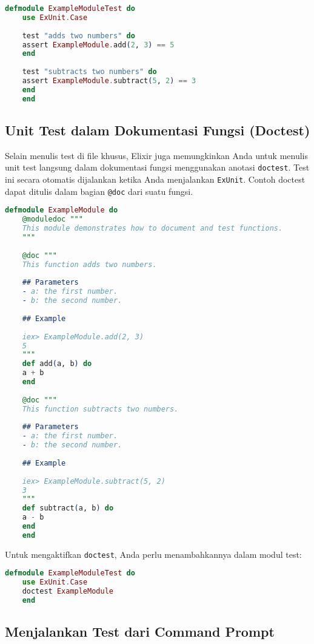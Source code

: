 \begin{lstlisting}[language=Elixir]
	defmodule ExampleModuleTest do
	use ExUnit.Case
	
	test "adds two numbers" do
	assert ExampleModule.add(2, 3) == 5
	end
	
	test "subtracts two numbers" do
	assert ExampleModule.subtract(5, 2) == 3
	end
	end
\end{lstlisting}

\subsection{Unit Test dalam Dokumentasi Fungsi (Doctest)}

Selain menulis test di file khusus, Elixir juga memungkinkan Anda untuk menulis unit test langsung dalam dokumentasi fungsi menggunakan anotasi \texttt{doctest}. Test ini secara otomatis dijalankan ketika Anda menjalankan \texttt{ExUnit}. Contoh doctest dapat ditulis dalam bagian \texttt{@doc} dari suatu fungsi.

\begin{lstlisting}[language=Elixir]
	defmodule ExampleModule do
	@moduledoc """
	This module demonstrates how to document and test functions.
	"""
	
	@doc """
	This function adds two numbers.
	
	## Parameters
	- a: the first number.
	- b: the second number.
	
	## Example
	
	iex> ExampleModule.add(2, 3)
	5
	"""
	def add(a, b) do
	a + b
	end
	
	@doc """
	This function subtracts two numbers.
	
	## Parameters
	- a: the first number.
	- b: the second number.
	
	## Example
	
	iex> ExampleModule.subtract(5, 2)
	3
	"""
	def subtract(a, b) do
	a - b
	end
	end
\end{lstlisting}

Untuk mengaktifkan \texttt{doctest}, Anda perlu menambahkannya dalam modul test:

\begin{lstlisting}[language=Elixir]
	defmodule ExampleModuleTest do
	use ExUnit.Case
	doctest ExampleModule
	end
\end{lstlisting}

\subsection{Menjalankan Test dari Command Prompt}

